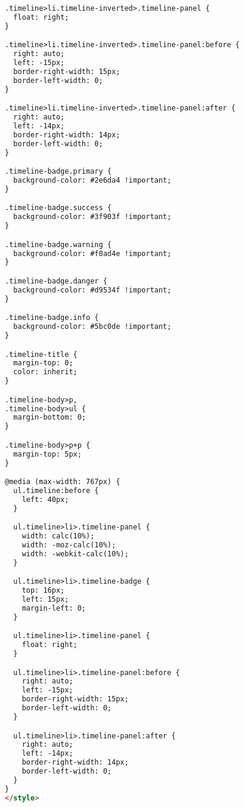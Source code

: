 \begin{lstlisting}[language=HTML]
.timeline>li.timeline-inverted>.timeline-panel {
  float: right;
}

.timeline>li.timeline-inverted>.timeline-panel:before {
  right: auto;
  left: -15px;
  border-right-width: 15px;
  border-left-width: 0;
}

.timeline>li.timeline-inverted>.timeline-panel:after {
  right: auto;
  left: -14px;
  border-right-width: 14px;
  border-left-width: 0;
}

.timeline-badge.primary {
  background-color: #2e6da4 !important;
}

.timeline-badge.success {
  background-color: #3f903f !important;
}

.timeline-badge.warning {
  background-color: #f0ad4e !important;
}

.timeline-badge.danger {
  background-color: #d9534f !important;
}

.timeline-badge.info {
  background-color: #5bc0de !important;
}

.timeline-title {
  margin-top: 0;
  color: inherit;
}

.timeline-body>p,
.timeline-body>ul {
  margin-bottom: 0;
}

.timeline-body>p+p {
  margin-top: 5px;
}

@media (max-width: 767px) {
  ul.timeline:before {
    left: 40px;
  }

  ul.timeline>li>.timeline-panel {
    width: calc(10%);
    width: -moz-calc(10%);
    width: -webkit-calc(10%);
  }

  ul.timeline>li>.timeline-badge {
    top: 16px;
    left: 15px;
    margin-left: 0;
  }

  ul.timeline>li>.timeline-panel {
    float: right;
  }

  ul.timeline>li>.timeline-panel:before {
    right: auto;
    left: -15px;
    border-right-width: 15px;
    border-left-width: 0;
  }

  ul.timeline>li>.timeline-panel:after {
    right: auto;
    left: -14px;
    border-right-width: 14px;
    border-left-width: 0;
  }
}
</style>
\end{lstlisting}
\pagebreak

